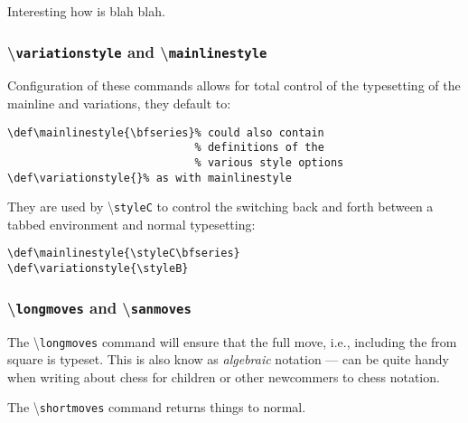 \documentclass[10pt]{article}
\newcommand{\command}[1]{\textbackslash\texttt{#1}}
\begin{document}
\begin{LTXexample}
\newgame
\styleC


Interesting how  is blah blah.
\end{LTXexample}

\styleB


\subsubsection{\command{variationstyle} and  \command{mainlinestyle}}
\label{sec:variationstyle}

Configuration of these commands allows for total control of the
typesetting of the mainline and variations, they default to:

\begin{verbatim}
\def\mainlinestyle{\bfseries}% could also contain
                             % definitions of the
                             % various style options
\def\variationstyle{}% as with mainlinestyle
\end{verbatim}

They are used by \command{styleC} to control the switching back and
forth between a tabbed environment and normal typesetting:

\begin{verbatim}
\def\mainlinestyle{\styleC\bfseries}
\def\variationstyle{\styleB}
\end{verbatim}



\subsubsection{\command{longmoves} and \command{sanmoves}}
\label{sec:commandlongmove}

The \command{longmoves} command will ensure that the full move, i.e., including the from
square is typeset. This is also know as \emph{algebraic} notation ---
can be quite handy when writing about chess for children or other
newcommers to chess notation.

\begin{LTXexample}
\newgame
\longmoves

\end{LTXexample}

\shortmoves

The \command{shortmoves} command returns things to normal.
\end{document}
